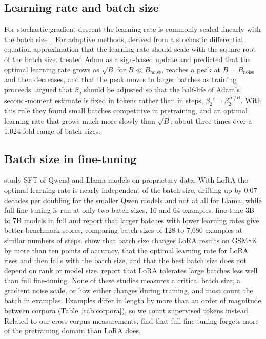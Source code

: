 \documentclass[10pt]{article}
\newcommand{\bnoise}{B_{\mathrm{noise}}}
\begin{document}
\subsection{Learning rate and batch size}

For stochastic gradient descent the learning rate is commonly scaled linearly with the batch size~\citep{goyal2017}. For adaptive methods, \citet{malladi2022} derived from a stochastic differential equation approximation that the learning rate should scale with the square root of the batch size. \citet{li2024surge} treated Adam as a sign-based update and predicted that the optimal learning rate grows as $\sqrt{B}$ for $B \ll \bnoise$, reaches a peak at $B = \bnoise$ and then decreases, and that the peak moves to larger batches as training proceeds. \citet{marek2025} argued that $\beta_2$ should be adjusted so that the half-life of Adam's second-moment estimate is fixed in tokens rather than in steps, $\beta_2' = \beta_2^{B'/B}$. With this rule they found small batches competitive in pretraining, and an optimal learning rate that grows much more slowly than $\sqrt{B}$, about three times over a 1,024-fold range of batch sizes.

\subsection{Batch size in fine-tuning}

\citet{oneill2026} study SFT of Qwen3 and Llama models on proprietary data. With LoRA the optimal learning rate is nearly independent of the batch size, drifting up by 0.07 decades per doubling for the smaller Qwen models and not at all for Llama, while full fine-tuning is run at only two batch sizes, 16 and 64 examples. \citet{pareja2024} fine-tune 3B to 7B models in full and report that larger batches with lower learning rates give better benchmark scores, comparing batch sizes of 128 to 7,680 examples at similar numbers of steps. \citet{lee2026} show that batch size changes LoRA results on GSM8K by more than ten points of accuracy, that the optimal learning rate for LoRA rises and then falls with the batch size, and that the best batch size does not depend on rank or model size. \citet{schulman2025} report that LoRA tolerates large batches less well than full fine-tuning. None of these studies measures a critical batch size, a gradient noise scale, or how either changes during training, and most count the batch in examples. Examples differ in length by more than an order of magnitude between corpora (Table~\ref{tab:corpora}), so we count supervised tokens instead. Related to our cross-corpus measurements, \citet{biderman2024} find that full fine-tuning forgets more of the pretraining domain than LoRA does.
\end{document}
